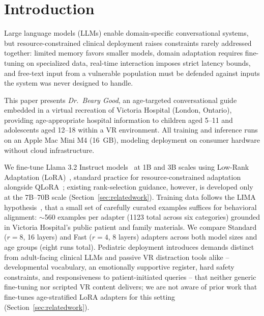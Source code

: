 \documentclass[pdflatex,sn-mathphys-num]{sn-jnl}%
\begin{document}

\maketitle

\section{Introduction}\label{sec1}

Large language models (LLMs) enable domain-specific conversational systems, but resource-constrained clinical deployment raises constraints rarely addressed together: limited memory favors smaller models, domain adaptation requires fine-tuning on specialized data, real-time interaction imposes strict latency bounds, and free-text input from a vulnerable population must be defended against inputs the system was never designed to handle.

This paper presents \textit{Dr.\ Beary Good}, an age-targeted conversational guide embedded in a virtual recreation of Victoria Hospital (London, Ontario), providing age-appropriate hospital information to children aged 5--11 and adolescents aged 12--18 within a VR environment. All training and inference runs on an Apple Mac Mini M4 (16~GB), modeling deployment on consumer hardware without cloud infrastructure.

We fine-tune Llama 3.2 Instruct models~\cite{dubey2024llama3} at 1B and 3B scales using Low-Rank Adaptation (LoRA)~\cite{hu2022lora}, standard practice for resource-constrained adaptation alongside QLoRA~\cite{dettmers2023qlora}; existing rank-selection guidance, however, is developed only at the 7B--70B scale (Section~\ref{sec:relatedwork}). Training data follows the LIMA hypothesis~\cite{zhou2023lima}, that a small set of carefully curated examples suffices for behavioral alignment: $\sim$560 examples per adapter (1123 total across six categories) grounded in Victoria Hospital's public patient and family materials. We compare Standard ($r=8$, 16 layers) and Fast ($r=4$, 8 layers) adapters across both model sizes and age groups (eight runs total). Pediatric deployment introduces demands distinct from adult-facing clinical LLMs and passive VR distraction tools alike -- developmental vocabulary, an emotionally supportive register, hard safety constraints, and responsiveness to patient-initiated queries -- that neither generic fine-tuning nor scripted VR content delivers; we are not aware of prior work that fine-tunes age-stratified LoRA adapters for this setting (Section~\ref{sec:relatedwork}).
\end{document}
